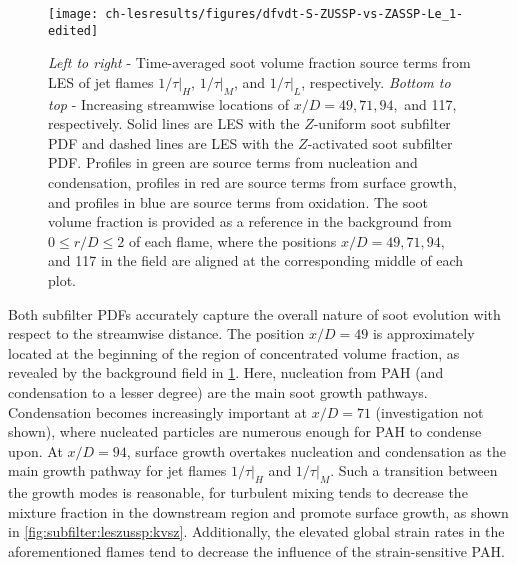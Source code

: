 \begin{figure}[H]
  \centering
  \texttt{[image: ch-lesresults/figures/dfvdt-S-ZUSSP-vs-ZASSP-Le\_1-edited]}
  \caption[Radial \texorpdfstring{$\langle df_V/dt \rangle$}{<dfV/dt>} from LES with \texorpdfstring{$Z$}{Z}-Activated Soot Subfilter PDF]{\textit{Left to right} - Time-averaged soot volume fraction source terms from LES of jet flames $1/\tau|_H$, $1/\tau|_M$, and $1/\tau|_L$, respectively. \textit{Bottom to top} - Increasing streamwise locations of $x/D = 49, 71, 94,$ and 117, respectively. Solid lines are LES with the $Z$-uniform soot subfilter PDF and dashed lines are LES with the $Z$-activated soot subfilter PDF. Profiles in green are source terms from nucleation and condensation, profiles in red are source terms from surface growth, and profiles in blue are source terms from oxidation. The soot volume fraction is provided as a reference in the background from $0 \le r/D \le 2$ of each flame, where the positions $x/D = 49, 71, 94,$ and 117 in the field are aligned at the corresponding middle of each plot.}
  \label{fig:lesresults:zassp:radialdfvdt}
\end{figure}

Both subfilter PDFs accurately capture the overall nature of soot evolution with respect to the streamwise distance. The position $x/D = 49$ is approximately located at the beginning of the region of concentrated volume fraction, as revealed by the background field in \cref{fig:lesresults:zassp:radialdfvdt}. Here, nucleation from PAH (and condensation to a lesser degree) are the main soot growth pathways. Condensation becomes increasingly important at $x/D = 71$ (investigation not shown), where nucleated particles are numerous enough for PAH to condense upon. At $x/D = 94$, surface growth overtakes nucleation and condensation as the main growth pathway for jet flames $1/\tau|_H$ and $1/\tau|_M$. Such a transition between the growth modes is reasonable, for turbulent mixing tends to decrease the mixture fraction in the downstream region and promote surface growth, as shown in \cref{fig:subfilter:leszussp:kvsz}. Additionally, the elevated global strain rates in the aforementioned flames tend to decrease the influence of the strain-sensitive PAH. %

